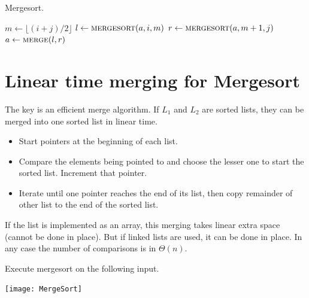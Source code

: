 \begin{algorithm}[H]
  \caption{Mergesort.}
    \label{alg:mergesort}
\begin{algorithmic}[0]
\State $m \gets \lfloor (i + j)/2 \rfloor$ 
\State $l \gets \Call{mergesort}{a,i,m}$ 
\State $r \gets  \Call{mergesort}{a,m+1,j}$ 
\State $a \gets  \Call{merge}{l, r}$ 
\EndIf
\State {}
\EndFunction  
\end{algorithmic}
\end{algorithm}

\section{Linear time merging for Mergesort}
The key is an efficient merge algorithm. 
If $L_1$ and $L_2$ are sorted lists, they can be merged into one sorted 
list in linear time.
\begin{itemize}
  \item Start pointers at the beginning of each list. 
  \item Compare the elements being pointed to 
  and choose the lesser one to start the sorted list. Increment that pointer. 
  \item Iterate until one pointer reaches the end of its list, 
  then copy remainder of other list to the end of the sorted list.
\end{itemize} 
If the list is implemented as an array, this merging takes linear extra 
space (cannot be done in place). But if linked lists are used, it can be done in 
place. In any case the number of comparisons is in $\Theta(n)$.


\begin{Boxample}[0]
Execute mergesort on the following input.
\begin{center}
\texttt{[image: MergeSort]} 
\end{center}
\end{Boxample}

